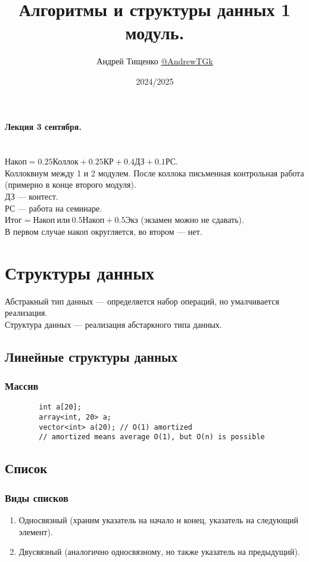 \documentclass[12pt, a4paper]{article}
\title{Алгоритмы и структуры данных 1 модуль.}
\author{Андрей Тищенко \href{https://t.me/AndrewTGk}{@AndrewTGk}}
\date{2024/2025}
\begin{document}
  \maketitle
  \tableofcontents
    \begin{center}
        \textbf{Лекция 3 сентября.}
    \end{center}
    \section*{}
    $\text{Накоп} = 0.25\text{Коллок} + 0.25\text{КР} + 0.4\text{ДЗ} + 0.1\text{РС}$.\\
    Коллоквиум между 1 и 2 модулем. После коллока 
    письменная контрольная работа (примерно в конце 
    второго модуля).\\
    ДЗ --- контест.\\ 
    РС --- работа на семинаре.\\
    $\text{Итог} = \text{Накоп}\ \text{или}\ 0.5\text{Накоп} + 0.5\text{Экз}$ (экзамен можно не сдавать).\\
    В первом случае накоп округляется, во втором --- нет.
    \section{Структуры данных}
    $\textit{Абстракный тип данных}$ --- определяется набор операций, 
    но умалчивается реализация.\\
    $\textit{Структура данных}$ --- реализация абстаркного типа данных.
    \subsection{Линейные структуры данных}
    \subsubsection*{Массив}
    \begin{lstlisting}
        int a[20];
        array<int, 20> a;
        vector<int> a(20); // O(1) amortized 
        // amortized means average O(1), but O(n) is possible
    \end{lstlisting}
    \subsection{Список}
        \subsubsection*{Виды списков}
        \begin{enumerate}
            \item Односвязный (храним указатель на начало и конец, указатель на следующий элемент).
            \item Двусвязный (аналогично односвязному, но также указатель на предыдущий).
        \end{enumerate}
\end{document}
